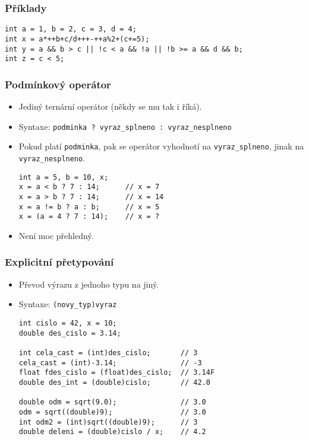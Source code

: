 \documentclass{beamer}
\begin{document}
\begin{frame}[t,fragile]\frametitle{Příklady} 
\begin{verbatim} 
int a = 1, b = 2, c = 3, d = 4;
int x = a*++b+c/d+++-++a%2+(c+=5);
int y = a && b > c || !c < a && !a || !b >= a && d && b;
int z = c < 5;
\end{verbatim}
\end{frame}


\begin{frame}[t,fragile]\frametitle{Podmínkový operátor} 
  \begin{itemize}
    \item Jediný ternární operátor (někdy se mu tak i říká).
    \item Syntaxe: \texttt{podminka ? vyraz\_splneno : vyraz\_nesplneno}
    \item Pokud platí \texttt{podminka}, pak se operátor vyhodnotí na \texttt{vyraz\_splneno}, jinak na \texttt{vyraz\_nesplneno}.
\begin{verbatim} 
int a = 5, b = 10, x;
x = a < b ? 7 : 14;      // x = 7
x = a > b ? 7 : 14;      // x = 14
x = a != b ? a : b;      // x = 5
x = (a = 4 ? 7 : 14);    // x = ?
\end{verbatim}
    \item Není moc přehledný.
  \end{itemize}
\end{frame}



\begin{frame}[t,fragile]\frametitle{Explicitní přetypování} 
  \begin{itemize}
    \item Převod výrazu z jednoho typu na jiný.
    \item Syntaxe: \texttt{(novy\_typ)vyraz}
    \begin{verbatim} 
int cislo = 42, x = 10;
double des_cislo = 3.14;

int cela_cast = (int)des_cislo;       // 3
cela_cast = (int)-3.14;               // -3
float fdes_cislo = (float)des_cislo;  // 3.14F
double des_int = (double)cislo;       // 42.0

double odm = sqrt(9.0);               // 3.0
odm = sqrt((double)9);                // 3.0
int odm2 = (int)sqrt((double)9);      // 3
double deleni = (double)cislo / x;    // 4.2
    \end{verbatim}
  \end{itemize}
\end{frame}
\end{document}
